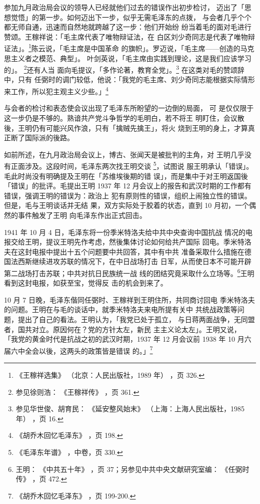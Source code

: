 参加九月政治局会议的领导人已经就他们过去的错误作出初步检讨，
迈出了「思想觉悟」的第一步。如何迈出下一步，似乎无需毛泽东的点拨，
与会者几乎个个都无师自通，迅速而自然地就跨越了这一步：他们开始纷
纷当着毛的面对毛进行赞颂。王稼祥说：「毛主席代表了唯物辩证法，在
白区刘少奇同志是代表了唯物辩证法」。\footnote{《王稼祥选集》
（北京：人民出版社，1989 年）
，页 326.}陈云说，「毛主席是中国革命
的旗帜」。罗迈说，「毛主席——创造的马克思主义者之模范、典型」。
叶剑英说，「毛主席由实践到理论，这是我们应该学习的」。
\footnote{参见徐则浩：
《王稼祥传》
，页 361.}还有人当
面向毛提议，「多作论著，教育全党」。\footnote{参见华世俊、胡育民：
《延安整风始末》
（上海：上海人民出版社，1985 年）
，页 16.} 在这类对毛的赞颂辞中，只有
任弼时的调门较低，他说：「我党的毛主席、刘少奇同志能根据实际情形
来工作，所以犯主观主义少些。」\footnote{《胡乔木回忆毛泽东》
，页 198.} 

与会者的检讨和表态使会议出现了毛泽东所盼望的一边倒的局面，
可
是仅仅限于这一步仍是不够的。熟谙共产党斗争哲学的毛明白，若不将王
明盯住，会议散後，王明仍有可能兴风作浪，只有「擒贼先擒王」，将火
烧到王明的身上，才算真正断了国际派的後路。

如前所述，在九月政治局会议上，博古、张闻天是被批判的主角，对
王明几乎没有正面涉及。这段时间，毛泽东两次找王明交谈
\footnote{《毛泽东年谱》
，中卷，页 330.}，试图说
服王明承认「错误」。毛此时尚没有明确提及王明在「苏维埃後期的错
误」，而是集中于对王明返国後「错误」的批评。毛提出王明 1937 年 12
月会议上的报告和武汉时期的工作都有错误，强调王明的错误为：政治上
犯有原则性的错误，组织上闹独立性的错误。但是，毛与王明谈话并无结
果，双方实际处于胶着的状态，直到 10 月初，一个偶然的事件触发了王明
向毛泽东作出正式回击。

1941 年 10 月 4 日，毛泽东将一份季米特洛夫给中共中央查询中国抗战
情况的电报交给王明，提议王明先作考虑，然後集体讨论如何给共产国际
回电。季米特洛夫在这封电报中提出十五个问题要中共回答，其中有中共
准备采取什么措施在德国法西斯继续进攻苏联的情况下，在中日战场打击
日军，从而使日本不可能开辟第二战场打击苏联；中共对抗日民族统一战
线的团结究竟采取什么立场等。\footnote{王明：
《中共五十年》
，页 37；另参见中共中央文献研究室编：
《任弼时传》
，页 472.}王明看到这封电报，如获至宝，觉得反
击的机会到来了。

10 月 7 日晚，毛泽东偕同任弼时、王稼祥到王明住所，共同商讨回电
季米特洛夫的问题。王明在与毛的谈话中，就季米特洛夫来电所提有关中
共统战政策等问题，提出了自己的看法。王明认为，「我党已处于孤立，
与日蒋两面战争，无同盟者，国共对立。原因何在？党的方针太左，新民
主主义论太左」。王明又说，
「我党的黄金时代是抗战之初的武汉时期，1937
年 12 月会议前 1938 年 10 月六届六中全会以後，这两头的政策皆是错误
的。」\footnote{《胡乔木回忆毛泽东》
，页 199-200.}

